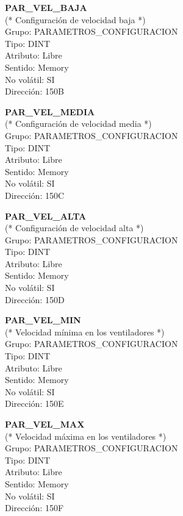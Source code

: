 \vspace{10mm}

\textbf{PAR\_VEL\_BAJA}\\(* Configuración de velocidad baja *)\\Grupo: PARAMETROS\_CONFIGURACION\\Tipo: DINT\\Atributo: Libre\\Sentido: Memory\\No volátil: SI\\Dirección: 150B

\vspace{10mm}

\textbf{PAR\_VEL\_MEDIA}\\(* Configuración de velocidad media *)\\Grupo: PARAMETROS\_CONFIGURACION\\Tipo: DINT\\Atributo: Libre\\Sentido: Memory\\No volátil: SI\\Dirección: 150C

\vspace{10mm}

\textbf{PAR\_VEL\_ALTA}\\(* Configuración de velocidad alta *)\\Grupo: PARAMETROS\_CONFIGURACION\\Tipo: DINT\\Atributo: Libre\\Sentido: Memory\\No volátil: SI\\Dirección: 150D

\vspace{10mm}

\textbf{PAR\_VEL\_MIN}\\(* Velocidad mínima en los ventiladores *)\\Grupo: PARAMETROS\_CONFIGURACION\\Tipo: DINT\\Atributo: Libre\\Sentido: Memory\\No volátil: SI\\Dirección: 150E

\vspace{10mm}

\textbf{PAR\_VEL\_MAX}\\(* Velocidad máxima en los ventiladores *)\\Grupo: PARAMETROS\_CONFIGURACION\\Tipo: DINT\\Atributo: Libre\\Sentido: Memory\\No volátil: SI\\Dirección: 150F

